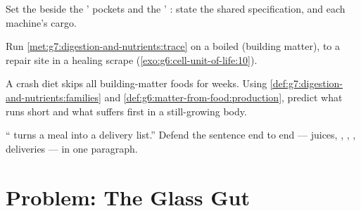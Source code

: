\begin{exercise}[$\star\star$]\label{exo:g7:digestion-and-nutrients:9}
Set the  beside the ' pockets and the '
: state the shared specification, and each
machine's cargo.
\end{exercise}

\begin{exercise}[$\star\star$]\label{exo:g7:digestion-and-nutrients:10}
Run \cref{met:g7:digestion-and-nutrients:trace} on a
boiled  (building matter), to a repair site in a
healing scrape (\cref{exo:g6:cell-unit-of-life:10}).
\end{exercise}

\begin{exercise}[$\star\star$]\label{exo:g7:digestion-and-nutrients:11}
A crash diet skips all building-matter foods for weeks.
Using \cref{def:g7:digestion-and-nutrients:families} and
\cref{def:g6:matter-from-food:production}, predict what
runs short and what suffers first in a still-growing
body.
\end{exercise}

\begin{exercise}[$\star\star\star$]\label{exo:g7:digestion-and-nutrients:12}
`` turns a meal into a delivery list.'' Defend
the sentence end to end --- juices, , ,
, deliveries --- in one paragraph.
\end{exercise}

\section{Problem: The Glass Gut}

